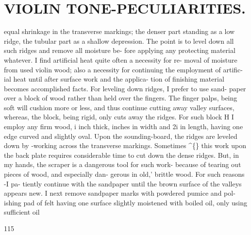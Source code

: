 \documentclass{article}
\begin{document}
\section*{VIOLIN TONE-PECULIARITIES.}
equal shrinkage in the transverse markings; the denser part standing as a low ridge, the tubular part as a shallow depression. The point is to level down all such ridges and remove all moisture be- fore applying any protecting material whatever. I find artificial heat quite often a necessity for re- moval of moisture from used violin wood; also a necessity for continuing the employment of artific- ial heat until after surface work and the applica- tion of finishing material becomes accomplished facts. For leveling down ridges, I prefer to use sand- paper over a block of wood rather than held over the fingers. The finger palps, being soft will cushion more or less, and thus continue cutting away valley surfaces, whereas, the block, being rigid, only cuts away the ridges. For such block H I employ any firm wood, i inch thick, inches in width and 2i in length, having one edge curved and slightly oval. Upon the sounding-board, the ridges are leveled down by -working across the transverse markings. Sometimes \textasciicircum\{\} this work upon the back plate requires considerable time to cut down the dense ridges. But, in my hands, the scraper is a dangerous tool for such work- because of tearing out pieces of wood, and especially dan- gerous in old,' brittle wood. For such reasons -I pa- tiently continue with the sandpaper until the brown surface of the valleys appears new. I next remove sandpaper marks with powdered pumice and pol- ishing pad of felt having one surface slightly moistened with boiled oil, only using sufficient oil

115
\end{document}
